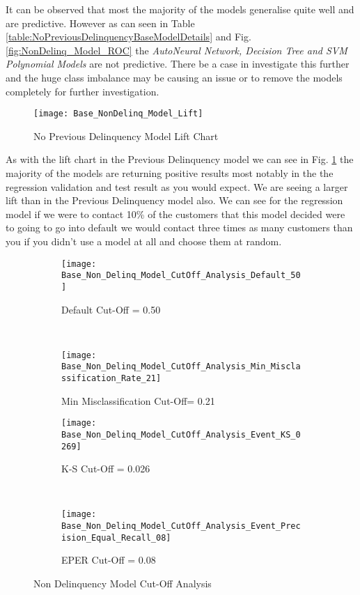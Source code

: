 It can be observed that most the majority of the models generalise quite well and are predictive. However as can seen in Table \ref{table:NoPreviousDelinquencyBaseModelDetails} and Fig. \ref{fig:NonDelinq_Model_ROC} the \textit{AutoNeural Network, Decision Tree and SVM Polynomial Models} are not predictive. There be a case in investigate this further and the huge class imbalance may be causing an issue or to remove the models completely for further investigation.

\begin{figure}[H]
	\texttt{[image: Base\_NonDelinq\_Model\_Lift]}
	\caption{No Previous Delinquency Model Lift Chart}
	\label{fig:NonDelinq_Model_Lift}
\end{figure}

As with the lift chart in the Previous Delinquency model we can see in Fig. \ref{fig:NonDelinq_Model_Lift} the majority of the models are returning positive results most notably in the the regression validation and test result as you would expect. We are seeing a larger lift than in the Previous Delinquency model also. We can see for the regression model if we were to contact 10\% of the customers that this model decided were to going to go into default we would contact three times as many customers than you if you didn't use a model at all and choose them at random. 

\begin{figure}[H]
	\centering
	\begin{subfigure}[b]{ 0.45\textwidth}
		\captionsetup{font=scriptsize}
		\texttt{[image: Base\_Non\_Delinq\_Model\_CutOff\_Analysis\_Default\_50]}\caption{Default Cut-Off = 0.50}\label{fig:Base_Non_Delinq_Model_CutOff_Analysis_Default_50}
	\end{subfigure}  ~\quad
	\begin{subfigure}[b]{0.45\textwidth}
		\captionsetup{font=scriptsize}
		\texttt{[image: Base\_Non\_Delinq\_Model\_CutOff\_Analysis\_Min\_Misclassification\_Rate\_21]}
		\caption{Min Misclassification Cut-Off= 0.21}\label{fig:Base_Non_Delinq_Model_CutOff_Analysis_Min_Misclassification_Rate_17}
	\end{subfigure} 
	\medskip \newline
	\begin{subfigure}[b]{0.45\textwidth}
		\captionsetup{font=scriptsize}
		\texttt{[image: Base\_Non\_Delinq\_Model\_CutOff\_Analysis\_Event\_KS\_0269]}
		\caption{K-S Cut-Off = 0.026}\label{fig:Base_Non_Delinq_Model_CutOff_Analysis_Event_KS_026}
	\end{subfigure} ~\quad
	\begin{subfigure}[b]{0.45\textwidth}
		\captionsetup{font=scriptsize}
		\texttt{[image: Base\_Non\_Delinq\_Model\_CutOff\_Analysis\_Event\_Precision\_Equal\_Recall\_08]}
		\caption{EPER Cut-Off = 0.08}\label{fig:Base_Non_Delinq_Model_CutOff_Analysis_Event_Precision_Equal_Recall_09}
	\end{subfigure}
	\caption{Non Delinquency Model Cut-Off Analysis}
	\label{fig:NonDelinquencyModelCutOffAnalysis}
\end{figure}

